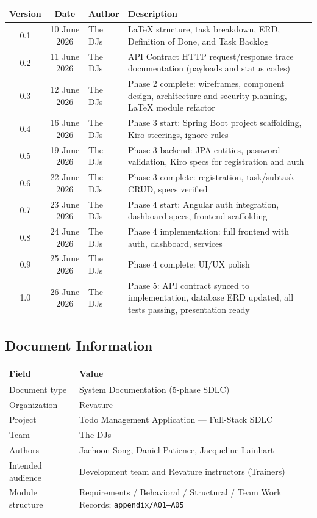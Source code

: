 \vspace{0.4cm}
\begin{tabularx}{\textwidth}{@{} c c l X @{}}
  \toprule
  \textbf{Version} & \textbf{Date} & \textbf{Author} & \textbf{Description} \\
  \midrule
  0.1 & 10 June 2026 & The DJs & LaTeX structure, task breakdown, ERD, Definition of Done, and Task Backlog \\
  0.2 & 11 June 2026 & The DJs & API Contract HTTP request/response trace documentation (payloads and status codes) \\
  0.3 & 12 June 2026 & The DJs & Phase 2 complete: wireframes, component design, architecture and security planning, LaTeX module refactor \\
  0.4 & 16 June 2026 & The DJs & Phase 3 start: Spring Boot project scaffolding, Kiro steerings, ignore rules \\
  0.5 & 19 June 2026 & The DJs & Phase 3 backend: JPA entities, password validation, Kiro specs for registration and auth \\
  0.6 & 22 June 2026 & The DJs & Phase 3 complete: registration, task/subtask CRUD, specs verified \\
  0.7 & 23 June 2026 & The DJs & Phase 4 start: Angular auth integration, dashboard specs, frontend scaffolding \\
  0.8 & 24 June 2026 & The DJs & Phase 4 implementation: full frontend with auth, dashboard, services \\
  0.9 & 25 June 2026 & The DJs & Phase 4 complete: UI/UX polish \\
  1.0 & 26 June 2026 & The DJs & Phase 5: API contract synced to implementation, database ERD updated, all tests passing, presentation ready \\
  \bottomrule
\end{tabularx}

\vspace{1.2cm}
\subsection*{Document Information}
\begin{tabularx}{\textwidth}{@{} l X @{}}
  \toprule
  \textbf{Field} & \textbf{Value} \\
  \midrule
  Document type     & System Documentation (5-phase SDLC) \\
  Organization      & Revature \\
  Project           & Todo Management Application --- Full-Stack SDLC \\
  Team              & The DJs \\
  Authors           & Jaehoon Song, Daniel Patience, Jacqueline Lainhart \\
  Intended audience & Development team and Revature instructors (Trainers) \\
  Module structure  & Requirements / Behavioral / Structural / Team Work Records; \texttt{appendix/A01--A05} \\
  \bottomrule
\end{tabularx}

\newpage
